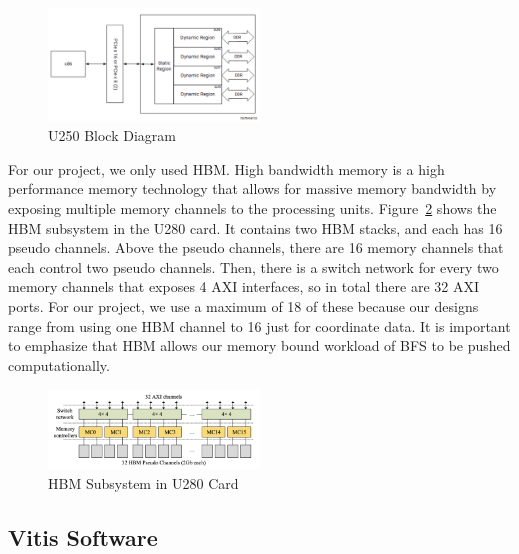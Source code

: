 \documentclass[10pt]{article}
\begin{document}
\begin{figure}[h!]
  \centering
  \includegraphics[width=0.5\textwidth]{u250.png}
  \caption{U250 Block Diagram}
  \label{fig:u250}
\end{figure}

\noindent For our project, we only used HBM. High bandwidth memory is a high performance memory technology that 
allows for massive memory bandwidth by exposing multiple memory channels to the processing units. Figure~\ref{fig:hbm} 
shows the HBM subsystem in the U280 card. It contains two HBM stacks, and each has 16 pseudo channels. Above the pseudo 
channels, there are 16 memory channels that each control two pseudo channels. Then, there is a switch network for 
every two memory channels that exposes 4 AXI interfaces, so in total there are 32 AXI ports. For our project, we 
use a maximum of 18 of these because our designs range from using one HBM channel to 16 just for coordinate data. 
It is important to emphasize that HBM allows our memory bound workload of BFS to be pushed computationally. 

\begin{figure}[h!]
  \centering
  \includegraphics[width=0.5\textwidth]{hbm.png}
  \caption{HBM Subsystem in U280 Card}
  \label{fig:hbm}
\end{figure}

\subsection{Vitis Software}
\end{document}
